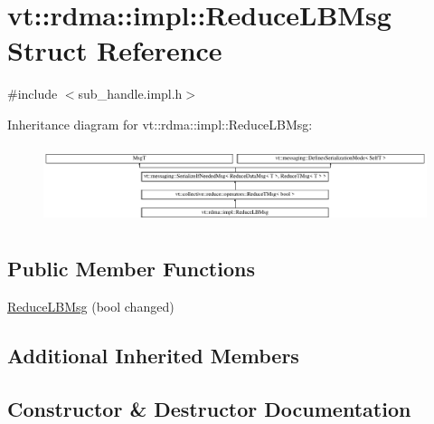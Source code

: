 \hypertarget{structvt_1_1rdma_1_1impl_1_1_reduce_l_b_msg}{}\section{vt\+:\+:rdma\+:\+:impl\+:\+:Reduce\+L\+B\+Msg Struct Reference}
\label{structvt_1_1rdma_1_1impl_1_1_reduce_l_b_msg}


{\ttfamily \#include $<$sub\+\_\+handle.\+impl.\+h$>$}

Inheritance diagram for vt\+:\+:rdma\+:\+:impl\+:\+:Reduce\+L\+B\+Msg\+:\begin{figure}[H]
\begin{center}
\leavevmode
\includegraphics[height=2.299795cm]{structvt_1_1rdma_1_1impl_1_1_reduce_l_b_msg}
\end{center}
\end{figure}
\subsection*{Public Member Functions}
\begin{DoxyCompactItemize}
\item 
\hyperlink{structvt_1_1rdma_1_1impl_1_1_reduce_l_b_msg_aad27e6469e2f4d79a5f3f9e4919208ae}{Reduce\+L\+B\+Msg} (bool changed)
\end{DoxyCompactItemize}
\subsection*{Additional Inherited Members}


\subsection{Constructor \& Destructor Documentation}
\mbox{\label{structvt_1_1rdma_1_1impl_1_1_reduce_l_b_msg_aad27e6469e2f4d79a5f3f9e4919208ae}} 
